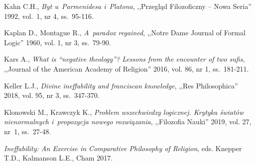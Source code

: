\begin{thebibliography}{100}
Kahn C.H., \textit{Byt u~Parmenidesa i~Platona}, ,,Przegląd Filozoficzny -- Nowa Seria'' 1992, vol.~1, nr 4, ss.~95-116.


Kaplan D., Montague R., \textit{A~paradox regained}, ,,Notre Dame Journal of Formal Logic'' 1960, vol. 1, nr 3, ss.~79-90.

Kars A., \textit{What is ``negative theology''? Lessons from the encounter of two sufis}, ,,Journal of the American Academy of Religion'' 2016, vol. 86, nr 1, ss.~181-211.



Keller L.J., \textit{Divine ineffability and franciscan knowledge}, ,,Res Philosophica'' 2018, vol. 95, nr 3, ss.~347-370.


Klonowski M., Krawczyk K., \textit{Problem wszechwiedzy logicznej. Krytyka światów nienormalnych i~propozycja nowego rozwiązania}, ,,Filozofia Nauki'' 2019, vol. 27, nr~1, ss.~27-48.


\textit{Ineffability: An Exercise in Comparative Philosophy of Religion}, eds. Knepper T.D., Kalmanson L.E., Cham 2017.


\end{thebibliography}
